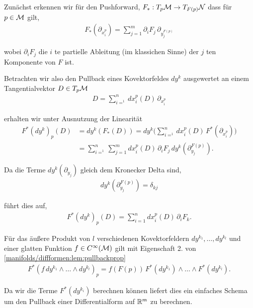 \par
Zunächst erkennen wir für den Pushforward, \(F_\ast:T_p\mathcal{M}\to T_{F(p)}\mathcal{N}\) dass für \(p\in\mathcal{M}\) gilt,
\begin{align*}
F_\ast(\partial_{x_i^p}) = \sum_{j=1}^m \partial_i F_j\, \partial_{y_j^{F(p)}}
\end{align*}
\par
wobei \(\partial_i F_j\) die \(i\) te partielle Ableitung (im klassichen Sinne) der \(j\) ten Komponente von \(F\) ist.

\par
Betrachten wir also den Pullback eines Kovektorfeldes \(dy^k\) ausgewertet an einem Tangentialvektor \(D\in T_p\mathcal{M}\)
\begin{align*}
D = \sum_{i=^1}^n dx_i^p(D)\, \partial_{x_i^p}
\end{align*}
\par
erhalten wir unter Ausnutzung der Linearität
\begin{align*}
F^\ast(dy^k)_{p}(D) &= dy^k(F_\ast(D)) = 
dy^k\big(\sum_{i=^1}^n dx_i^p(D)\, F^\ast(\partial_{x_i^p})\big)\\
&=
\sum_{i=^1}^n \sum_{j=1}^m dx_i^p(D)\,\partial_i F_j\, dy^k(\partial_{y_j}^{F(p)}).
\end{align*}
\par
Da die Terme \(dy^k(\partial_{y_j})\) gleich dem Kronecker Delta sind,
\begin{align*}
dy^k(\partial_{y_j}^{F(p)}) = \delta_{kj}
\end{align*}
\par
führt dies auf,
\begin{align*}
F^\ast(dy^k)_{p}(D) =
\sum_{i=1}^n dx_i^p(D)\,\partial_i F_k.
\end{align*}
\par
Für das äußere Produkt von \(l\) verschiedenen Kovektorfeldern \(dy^{k_1},\ldots, dy^{k_l}\) und einer glatten Funktion \(f\in C^\infty(\mathcal{M})\) gilt mit Eigenschaft 2. von \cref{manifolds/diffformen:lem:pullbackprop} \begin{align*}
F^\ast(f\, dy^{k_1}\wedge\ldots\wedge dy^{k_l})_{p} =
f(F(p))\, F^\ast(dy^{k_1})\wedge\ldots\wedge F^\ast(dy^{k_l}).
\end{align*}
\par
Da wir die Terme \(F^\ast(dy^{k_i})\) berechnen können liefert dies ein einfaches Schema um den Pullback einer Differentialform auf \(\mathbb{R}^m\) zu berechnen.
